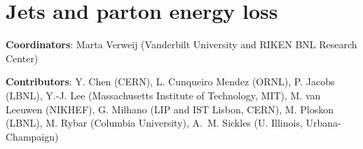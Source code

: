 \documentclass[../report.tex]{subfiles}
\providecommand{\main}{..}
\begin{document}
\section{Jets and parton energy loss}\label{sec:HI_Jets}

{ \small
  \noindent \textbf{Coordinators}: Marta Verweij (Vanderbilt University and RIKEN BNL Research Center)
  
\noindent \textbf{Contributors}:
Y. Chen (CERN),
L. Cunqueiro Mendez (ORNL),
P. Jacobs (LBNL),
Y.-J. Lee (Massachusetts Institute of Technology, MIT),
M. van Leeuwen (NIKHEF),
G. Milhano (LIP and IST Lisbon, CERN),
M. Ploskon (LBNL),
M. Rybar (Columbia University),
A.~M. Sickles (U. Illinois, Urbana-Champaign)
}



\newpage

\newpage

\newpage

\end{document}

